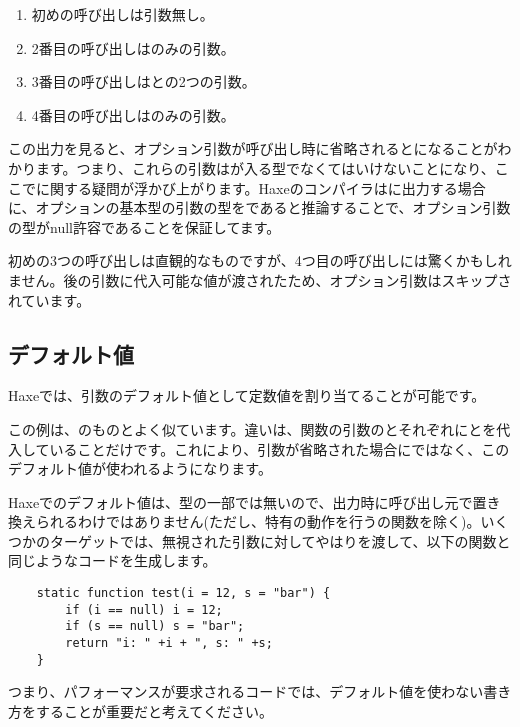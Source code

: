 \begin{enumerate}
	\item 初めの呼び出しは引数無し。
	\item 2番目の呼び出しはのみの引数。
	\item 3番目の呼び出しはとの2つの引数。
	\item 4番目の呼び出しはのみの引数。
\end{enumerate}

この出力を見ると、オプション引数が呼び出し時に省略されるとになることがわかります。つまり、これらの引数はが入る型でなくてはいけないことになり、ここでに関する疑問が浮かび上がります。Haxeのコンパイラはに出力する場合に、オプションの基本型の引数の型をであると推論することで、オプション引数の型がnull許容であることを保証してます。

初めの3つの呼び出しは直観的なものですが、4つ目の呼び出しには驚くかもしれません。後の引数に代入可能な値が渡されたため、オプション引数はスキップされています。

\subsection{デフォルト値}
\label{types-function-default-values}

Haxeでは、引数のデフォルト値として定数値を割り当てることが可能です。

この例は、のものとよく似ています。違いは、関数の引数のとそれぞれにとを代入していることだけです。これにより、引数が省略された場合にではなく、このデフォルト値が使われるようになります。


Haxeでのデフォルト値は、型の一部では無いので、出力時に呼び出し元で置き換えられるわけではありません(ただし、特有の動作を行うの関数を除く)。いくつかのターゲットでは、無視された引数に対してやはりを渡して、以下の関数と同じようなコードを生成します。

\begin{lstlisting}
	static function test(i = 12, s = "bar") {
		if (i == null) i = 12;
		if (s == null) s = "bar";
		return "i: " +i + ", s: " +s;
	}
\end{lstlisting}
つまり、パフォーマンスが要求されるコードでは、デフォルト値を使わない書き方をすることが重要だと考えてください。




